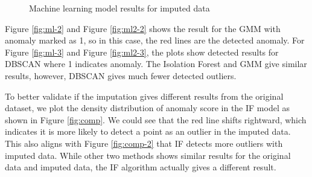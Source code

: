 \documentclass[
]{article}
\begin{document}
\begin{figure}[H]

{\centering {}\newline{}

}

\caption{Machine learning model results for imputed data}\label{fig:ml}
\end{figure}

Figure \ref{fig:ml-2} and Figure \ref{fig:ml2-2} shows the result for the GMM with anomaly marked as 1, so in this case, the red lines are the detected anomaly. For Figure \ref{fig:ml-3} and Figure \ref{fig:ml2-3}, the plots show detected results for DBSCAN where 1 indicates anomaly. The Isolation Forest and GMM give similar results, however, DBSCAN gives much fewer detected outliers.

To better validate if the imputation gives different results from the original dataset, we plot the density distribution of anomaly score in the IF model as shown in Figure \ref{fig:comp}. We could see that the red line shifts rightward, which indicates it is more likely to detect a point as an outlier in the imputed data. This also aligns with Figure \ref{fig:comp-2} that IF detects more outliers with imputed data. While other two methods shows similar results for the original data and imputed data, the IF algorithm actually gives a different result.
\end{document}
